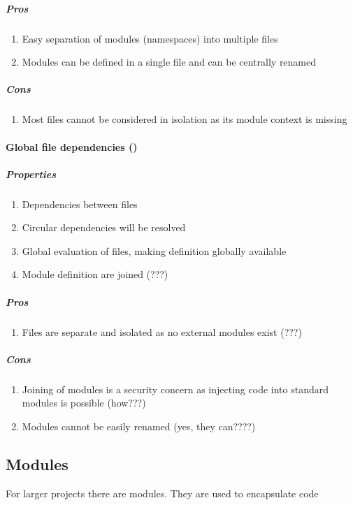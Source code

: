 \subparagraph{Pros}

\begin{enumerate}
	\item Easy separation of modules (namespaces) into multiple files
	\item Modules can be defined in a single file and can be centrally renamed
\end{enumerate}

\subparagraph{Cons}

\begin{enumerate}
	\item Most files cannot be considered in isolation as its module context is missing
\end{enumerate}

\paragraph{Global file dependencies (\javalang)}

\subparagraph{Properties}

\begin{enumerate}
	\item Dependencies between files
	\item Circular dependencies will be resolved
	\item Global evaluation of files, making definition globally available
	\item Module definition are joined (???)
\end{enumerate}

\subparagraph{Pros}

\begin{enumerate}
	\item Files are separate and isolated as no external modules exist (???)
\end{enumerate}

\subparagraph{Cons}

\begin{enumerate}
	\item Joining of modules is a security concern as injecting code into standard modules is possible (how???)
	\item Modules cannot be easily renamed (yes, they can????) 
\end{enumerate}


\subsection{Modules}

For larger projects there are modules. They are used to encapsulate code
